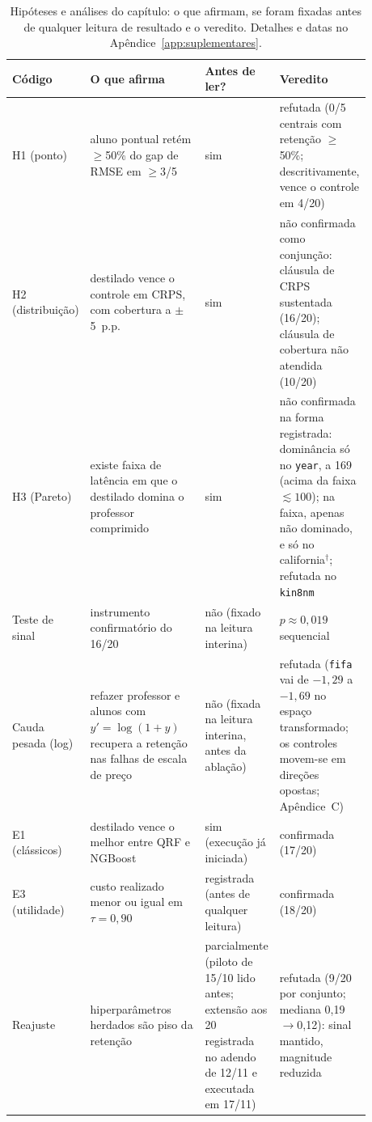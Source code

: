 \begin{table}[htbp]
\centering
\caption[Hipóteses do capítulo e estatuto de registro]{Hipóteses e
análises do capítulo: o que afirmam, se foram fixadas antes de
qualquer leitura de resultado e o veredito. Detalhes e datas no
Apêndice~\ref{app:suplementares}.}
\label{tab:destil-hipoteses}
\small
\begin{tabular}{>{\raggedright\arraybackslash}p{0.14\linewidth}>{\raggedright\arraybackslash}p{0.35\linewidth}>{\raggedright\arraybackslash}p{0.18\linewidth}>{\raggedright\arraybackslash}p{0.21\linewidth}}
\toprule
Código & O que afirma & Antes de ler? & Veredito \\
\midrule
H1 (ponto) & aluno pontual retém $\geq$50\% do gap de RMSE em
$\geq$3/5 & sim & refutada (0/5 centrais com retenção $\geq$50\%;
descritivamente, vence o controle em 4/20) \\
\addlinespace[2pt]
H2 (distribuição) & destilado vence o controle em CRPS, com cobertura
a $\pm$5~p.p. & sim & não confirmada como conjunção: cláusula de
CRPS sustentada (16/20); cláusula de cobertura não atendida
(10/20) \\
\addlinespace[2pt]
H3 (Pareto) & existe faixa de latência em que o destilado domina o
professor comprimido & sim & não confirmada na forma registrada:
dominância só no \texttt{year}, a 169~\us{} (acima da faixa
${\lesssim}100$); na faixa, apenas não dominado, e só no
california$^\dagger$; refutada no \texttt{kin8nm} \\
\addlinespace[2pt]
Teste de sinal & instrumento confirmatório do 16/20 & não
(fixado na leitura interina) & $p\approx0{,}019$ sequencial \\
\addlinespace[2pt]
Cauda pesada (log) & refazer professor e alunos com
$y'{=}\log(1{+}y)$ recupera a retenção nas falhas de escala de preço
& não (fixada na leitura interina, antes da ablação) & refutada
(\texttt{fifa} vai de $-1{,}29$ a $-1{,}69$ no espaço transformado;
os controles movem-se em direções opostas; Apêndice~C) \\
\addlinespace[2pt]
E1 (clássicos) & destilado vence o melhor entre QRF e NGBoost & sim
(execução já iniciada) & confirmada (17/20) \\
\addlinespace[2pt]
E3 (utilidade) & custo realizado menor ou igual em $\tau{=}0{,}90$ & registrada
(antes de qualquer leitura) & confirmada (18/20) \\
\addlinespace[2pt]
Reajuste & hiperparâmetros herdados são piso da retenção &
parcialmente (piloto de 15/10 lido antes; extensão aos 20 registrada
no adendo de 12/11 e executada em 17/11) & refutada (9/20 por conjunto; mediana
0,19$\to$0,12): sinal mantido, magnitude reduzida \\
\bottomrule
\end{tabular}
\end{table}

